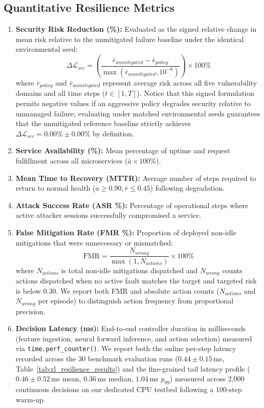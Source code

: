 \documentclass[ASNA,twocolumn]{USG}
\begin{document}
\subsection{Quantitative Resilience Metrics}
\begin{enumerate}
    \item \textbf{Security Risk Reduction (\%):} Evaluated as the signed relative change in mean risk relative to the unmitigated failure baseline under the identical environmental seed:
    \begin{equation}
        \label{eq:risk_reduction}
        \Delta \mathcal{L}_{sec} = \left(\frac{\bar{r}_{unmitigated} - \bar{r}_{policy}}{\max(\bar{r}_{unmitigated}, 10^{-6})}\right) \times 100\%
    \end{equation}
    where $\bar{r}_{policy}$ and $\bar{r}_{unmitigated}$ represent average risk across all five vulnerability domains and all time steps ($t \in [1, T]$). Notice that this signed formulation permits negative values if an aggressive policy degrades security relative to unmanaged failure; evaluating under matched environmental seeds guarantees that the unmitigated reference baseline strictly achieves $\Delta \mathcal{L}_{sec} = 0.00\% \pm 0.00\%$ by definition.
    \item \textbf{Service Availability (\%):} Mean percentage of uptime and request fulfillment across all microservices ($\bar{a} \times 100\%$).
    \item \textbf{Mean Time to Recovery (MTTR):} Average number of steps required to return to normal health ($a \ge 0.90, \bar{r} \le 0.45$) following degradation.
    \item \textbf{Attack Success Rate (ASR \%):} Percentage of operational steps where active attacker sessions successfully compromised a service.
    \item \textbf{False Mitigation Rate (FMR \%):} Proportion of deployed non-idle mitigations that were unnecessary or mismatched:
    \begin{equation}
        \label{eq:fmr}
        \text{FMR} = \frac{N_{wrong}}{\max(1, N_{actions})} \times 100\%
    \end{equation}
    where $N_{actions}$ is total non-idle mitigations dispatched and $N_{wrong}$ counts actions dispatched when no active fault matches the target and targeted risk is below $0.30$. We report both FMR and absolute action counts ($N_{actions}$ and $N_{wrong}$ per episode) to distinguish action frequency from proportional precision.
    \item \textbf{Decision Latency (ms):} End-to-end controller duration in milliseconds (feature ingestion, neural forward inference, and action selection) measured via \texttt{time.perf\_counter()}. We report both the online per-step latency recorded across the 30 benchmark evaluation runs ($0.44 \pm 0.15$\,ms, Table~\ref{tab:rl_resilience_results}) and the fine-grained tail latency profile ($0.46 \pm 0.52$\,ms mean, $0.36$\,ms median, $1.04$\,ms $p_{99}$) measured across 2,000 continuous decisions on our dedicated CPU testbed following a 100-step warm-up.

\end{enumerate}
\end{document}
